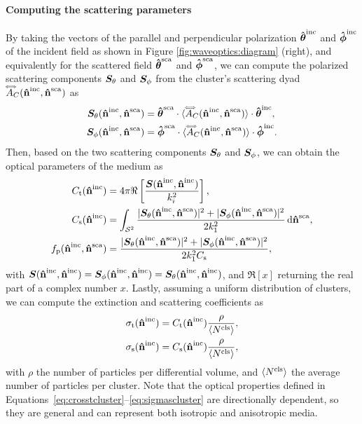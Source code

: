 \paragraph{Computing the scattering parameters}
By taking the vectors of the parallel and perpendicular polarization $\mathbf{\hat{\boldsymbol\theta}}^\text{inc}$ and $\mathbf{\hat{\boldsymbol\phi}}^\text{inc}$ of the incident field as shown in Figure \ref{fig:waveoptics:diagram} (right), and equivalently for the scattered field $\mathbf{\hat{\boldsymbol\theta}}^\text{sca}$ and $\mathbf{\hat{\boldsymbol\phi}}^\text{sca}$, we can compute the polarized scattering components $\bm{S}_\theta$ and $\bm{S}_\phi$ from the cluster's scattering dyad $\accentset{\Longleftrightarrow}{A}_C(\mathbf{\hat{n}}^{\text{inc}},\mathbf{\hat{n}}^{\text{sca}})$ as
\begin{align}
  \bm{S}_\theta(\mathbf{\hat{n}}^{\text{inc}},\mathbf{\hat{n}}^{\text{sca}}) &= \mathbf{\hat{\boldsymbol\theta}}^\text{sca} \cdot {\langle \accentset{\Longleftrightarrow}{A}_C(\mathbf{\hat{n}}^{\text{inc}},\mathbf{\hat{n}}^{\text{sca}}) \rangle} \cdot \mathbf{\hat{\boldsymbol\theta}}^\text{inc}, \nonumber \\
  \bm{S}_\phi(\mathbf{\hat{n}}^{\text{inc}},\mathbf{\hat{n}}^{\text{sca}}) &= \mathbf{\hat{\boldsymbol\phi}}^\text{sca} \cdot {\langle \accentset{\Longleftrightarrow}{A}_C(\mathbf{\hat{n}}^{\text{inc}},\mathbf{\hat{n}}^{\text{sca}}) \rangle} \cdot \mathbf{\hat{\boldsymbol\phi}}^\text{inc}.
\end{align}
Then, based on the two scattering components $\bm{S}_\theta$ and $\bm{S}_\phi$, we can obtain the optical parameters of the medium as
\begin{align}
    \label{eq:crosstcluster}
    \cT(\dwi) &= 4\pi \Re\left[\frac{\ScaMatrix(\dwi,\dwi)}{k_i^2}\right], \\
    \label{eq:crossscluster}
    \cS(\dwi) &=\int_\Sph \frac{|\ScaMatrix_\theta(\dwi,\dws)|^2+|\ScaMatrix_\phi(\dwi,\dws)|^2}{2k_1^2} \diff{\dws}, \\
    \label{eq:phasecluster}
    \phase(\dwi,\dws) &= \frac{|\ScaMatrix_\theta(\dwi,\dws)|^2+|\ScaMatrix_\phi(\dwi,\dws)|^2}{2k_1^2\cS},
\end{align}
with $\bm{S}(\mathbf{\hat{n}}^{\text{inc}},\mathbf{\hat{n}}^{\text{inc}})=\bm{S}_\phi(\mathbf{\hat{n}}^{\text{inc}},\mathbf{\hat{n}}^{\text{inc}})=\bm{S}_\theta(\mathbf{\hat{n}}^{\text{inc}},\mathbf{\hat{n}}^{\text{inc}})$, and $\Re[x]$ returning the real part of a complex number $x$. Lastly, assuming a uniform distribution of clusters, we can compute the extinction and scattering coefficients as
\begin{align}
    \label{eq:sigmatcluster}
    \sigT(\dwi) &= \cT(\dwi) \frac{\rho}{\EV{\Ncls}}, \\
    \label{eq:sigmascluster}
    \sigS(\dwi) &= \cS(\dwi) \frac{\rho}{\EV{\Ncls}},
\end{align}
with $\rho$ the number of particles per differential volume, and ${\langle {N^\text{cls}} \rangle}$ the average number of particles per cluster. Note that the optical properties defined in Equations~\eqref{eq:crosstcluster}--\eqref{eq:sigmascluster} are directionally dependent, so they are general and can represent both isotropic and anisotropic media. 


